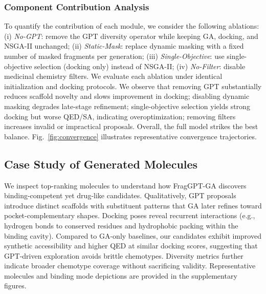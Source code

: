 \documentclass[lettersize,journal]{IEEEtran}
\begin{document}
\subsubsection{Component Contribution Analysis}
To quantify the contribution of each module, we consider the following ablations: (i) \textit{No-GPT}: remove the GPT diversity operator while keeping GA, docking, and NSGA-II unchanged; (ii) \textit{Static-Mask}: replace dynamic masking with a fixed number of masked fragments per generation; (iii) \textit{Single-Objective}: use single-objective selection (docking only) instead of NSGA-II; (iv) \textit{No-Filter}: disable medicinal chemistry filters. We evaluate each ablation under identical initialization and docking protocols. We observe that removing GPT substantially reduces scaffold novelty and slows improvement in docking; disabling dynamic masking degrades late-stage refinement; single-objective selection yields strong docking but worse QED/SA, indicating overoptimization; removing filters increases invalid or impractical proposals. Overall, the full model strikes the best balance. Fig.~\ref{fig:convergence} illustrates representative convergence trajectories.

\subsection{Case Study of Generated Molecules}
We inspect top-ranking molecules to understand how FragGPT-GA discovers binding-competent yet drug-like candidates. Qualitatively, GPT proposals introduce distinct scaffolds with substituent patterns that GA later refines toward pocket-complementary shapes. Docking poses reveal recurrent interactions (e.g., hydrogen bonds to conserved residues and hydrophobic packing within the binding cavity). Compared to GA-only baselines, our candidates exhibit improved synthetic accessibility and higher QED at similar docking scores, suggesting that GPT-driven exploration avoids brittle chemotypes. Diversity metrics further indicate broader chemotype coverage without sacrificing validity. Representative molecules and binding mode depictions are provided in the supplementary figures.
\end{document}
